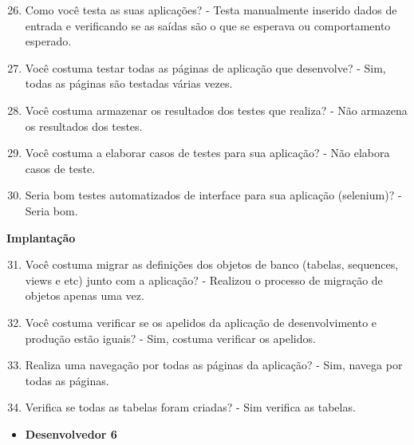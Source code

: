 \begin{apendicesenv}
\begin{enumerate}
	\setcounter{enumi}{25}
	\item Como você testa as suas aplicações?\newline
	- Testa manualmente inserido dados de entrada e verificando se as saídas são o que se esperava ou comportamento esperado.
	\item Você costuma testar todas as páginas de aplicação que desenvolve?\newline
	- Sim, todas as páginas são testadas várias vezes.
	\item Você costuma armazenar os resultados dos testes que realiza?\newline
	- Não armazena os resultados dos testes.
	\item Você costuma a elaborar casos de testes para sua aplicação?\newline
	- Não elabora casos de teste.
	\item Seria bom testes automatizados de interface para sua aplicação (selenium)?\newline
	- Seria bom.
\end{enumerate}

\textbf{Implantação}

\begin{enumerate}
	\setcounter{enumi}{30}
	\item Você costuma migrar as definições dos objetos de banco (tabelas, sequences, views e
	etc) junto com a aplicação?\newline
	- Realizou o processo de migração de objetos apenas uma vez.
	\item Você costuma verificar se os apelidos da aplicação de desenvolvimento e produção
	estão iguais?\newline
	- Sim, costuma verificar os apelidos.
	\item Realiza uma navegação por todas as páginas da aplicação?\newline
	- Sim, navega por todas as páginas.
	\item Verifica se todas as tabelas foram criadas?\newline
	- Sim verifica as tabelas.
\end{enumerate}



\begin{itemize}
	\item \textbf{Desenvolvedor 6}
\end{itemize}


\end{apendicesenv}
